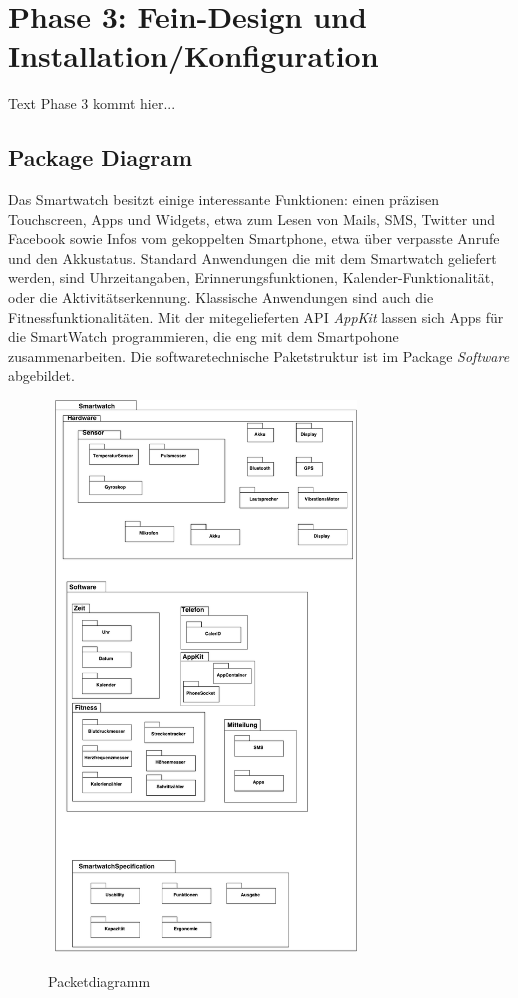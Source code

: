 \chapter{Phase 3: Fein-Design und Installation/Konfiguration}
Text Phase 3 kommt hier...

\section{Package Diagram}
Das Smartwatch besitzt einige interessante Funktionen: einen präzisen Touchscreen, Apps und Widgets, etwa zum Lesen von Mails, SMS, Twitter und Facebook sowie Infos vom gekoppelten Smartphone, etwa über verpasste Anrufe und den Akkustatus.
Standard Anwendungen die mit dem Smartwatch geliefert werden, sind Uhrzeitangaben, Erinnerungsfunktionen, Kalender-Funktionalität, oder die Aktivitätserkennung. 
Klassische Anwendungen sind auch die Fitnessfunktionalitäten.
Mit der mitegelieferten API \textit{AppKit} lassen sich Apps für die SmartWatch programmieren, die eng mit dem Smartpohone zusammenarbeiten.
Die softwaretechnische Paketstruktur ist im Package \textit{Software} abgebildet.

\begin{figure}[H]
\centering\
\includegraphics[width=8cm]{img/PackagePhase2}
\caption{Packetdiagramm}\label{fig:package}
\end{figure}

